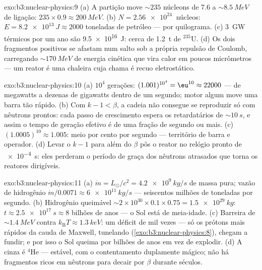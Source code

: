 \begin{solution}{exo:b3:nuclear-physics:9}
(a) A partição move ${\sim}235$ núcleons de \qty{7.6}{} a
${\sim}\qty{8.5}{MeV}$ de ligação: $235\times0.9 \approx
\qty{200}{MeV}$. (b) $N = \qty{2.56e24}{}$ núcleos:
$E = \qty{8.2e13}{J} \approx 2000$ toneladas de petróleo --- por
quilograma. (c) \qty{3}{GW} térmicos por um ano são
\qty{9.5e16}{J}: cerca de \qty{1.2}{t} de $^{235}$U. (d) Os dois
fragmentos positivos se afastam num salto sob a própria repulsão
de Coulomb, carregando ${\sim}\qty{170}{MeV}$ de energia cinética
que vira calor em poucos micrômetros --- um reator é uma chaleira
cuja chama é recuo eletrostático.
\end{solution}

\begin{solution}{exo:b3:nuclear-physics:10}
(a) $10^4$ gerações: $(1.001)^{10^4} = \eu^{10} \approx
22000$ --- de megawatts a dezenas de gigawatts dentro de um segundo;
motor algum move uma barra tão rápido. (b) Com $k - 1 < \beta$, a cadeia
não consegue se reproduzir só com nêutrons prontos: cada passo de
crescimento espera os retardatários de ${\sim}\qty{10}{s}$, e assim o
tempo de geração efetivo é de uma fração de segundo ou mais. (c)
$(1.0005)^{10} \approx 1.005$: meio por cento por segundo ---
território de barra e operador. (d) Levar o $k - 1$ para além do $\beta$
pôs o reator no relógio pronto de \qty{e-4}{s}: eles perderam o
período de graça dos nêutrons atrasados que torna os reatores dirigíveis.
\end{solution}

\begin{solution}{exo:b3:nuclear-physics:11}
(a) $\dot m = L_\odot/c^2 = \qty{4.2e9}{kg/s}$ de massa pura;
vazão de hidrogênio $\dot m/0.0071 \approx \qty{6e11}{kg/s}$ ---
seiscentos milhões de toneladas por segundo. (b) Hidrogênio queimável
${\sim}2\times10^{30}\times0.1\times0.75 = \qty{1.5e29}{kg}$:
$t \approx \qty{2.5e17}{s} \approx 8$ bilhões de anos --- o Sol
está de meia-idade. (c) Barreira de ${\sim}\qty{1.4}{MeV}$ contra
$k_{\text{B}}T \approx \qty{1.3}{keV}$: um déficit de mil vezes
--- só os prótons mais rápidos da cauda de Maxwell, tunelando
(\cref{exo:b3:nuclear-physics:8}), chegam a fundir; e por isso o Sol
queima por bilhões de anos em vez de explodir. (d) A cinza é
$^4$He --- estável, com o contentamento duplamente mágico; não há
fragmentos ricos em nêutrons para decair por $\beta$ durante séculos.
\end{solution}

